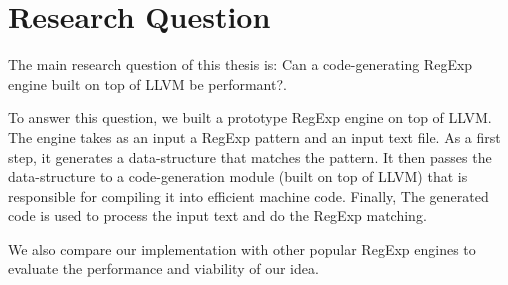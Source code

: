 \section{Research Question}

The main research question of this thesis is: Can a code-generating RegExp engine built on top of LLVM be performant?.

To answer this question, we built a prototype RegExp engine on top of LLVM. The engine takes as an input a RegExp pattern and an input text file. As a first step, it generates a data-structure that matches the pattern. It then passes the data-structure to a code-generation module (built on top of LLVM) that is responsible for compiling it into efficient machine code. Finally, The generated code is used to process the input text and do the RegExp matching.

We also compare our implementation with other popular RegExp engines to evaluate the performance and viability of our idea. 
